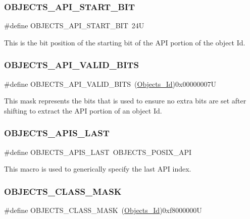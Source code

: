 \subsubsection{\texorpdfstring{OBJECTS\_API\_START\_BIT}{OBJECTS\_API\_START\_BIT}}
{\footnotesize\ttfamily \#define O\+B\+J\+E\+C\+T\+S\+\_\+\+A\+P\+I\+\_\+\+S\+T\+A\+R\+T\+\_\+\+B\+IT~24U}

This is the bit position of the starting bit of the A\+PI portion of the object Id. \mbox{\label{group__RTEMSScoreObject_ga583a79cd6454d84132d042c0d30aadb4}} 
\subsubsection{\texorpdfstring{OBJECTS\_API\_VALID\_BITS}{OBJECTS\_API\_VALID\_BITS}}
{\footnotesize\ttfamily \#define O\+B\+J\+E\+C\+T\+S\+\_\+\+A\+P\+I\+\_\+\+V\+A\+L\+I\+D\+\_\+\+B\+I\+TS~(\mbox{\hyperlink{group__RTEMSScoreObject_ga5821f52a51072941bdd603e542d0863e}{Objects\+\_\+\+Id}})0x00000007U}

This mask represents the bits that is used to ensure no extra bits are set after shifting to extract the A\+PI portion of an object Id. \mbox{\label{group__RTEMSScoreObject_ga238bef3e73c68907c9fbc51497250c13}} 
\subsubsection{\texorpdfstring{OBJECTS\_APIS\_LAST}{OBJECTS\_APIS\_LAST}}
{\footnotesize\ttfamily \#define O\+B\+J\+E\+C\+T\+S\+\_\+\+A\+P\+I\+S\+\_\+\+L\+A\+ST~O\+B\+J\+E\+C\+T\+S\+\_\+\+P\+O\+S\+I\+X\+\_\+\+A\+PI}

This macro is used to generically specify the last A\+PI index. \mbox{\label{group__RTEMSScoreObject_ga9d0033a6619edcd65e622c97e53c9bc7}} 
\subsubsection{\texorpdfstring{OBJECTS\_CLASS\_MASK}{OBJECTS\_CLASS\_MASK}}
{\footnotesize\ttfamily \#define O\+B\+J\+E\+C\+T\+S\+\_\+\+C\+L\+A\+S\+S\+\_\+\+M\+A\+SK~(\mbox{\hyperlink{group__RTEMSScoreObject_ga5821f52a51072941bdd603e542d0863e}{Objects\+\_\+\+Id}})0xf8000000U}

